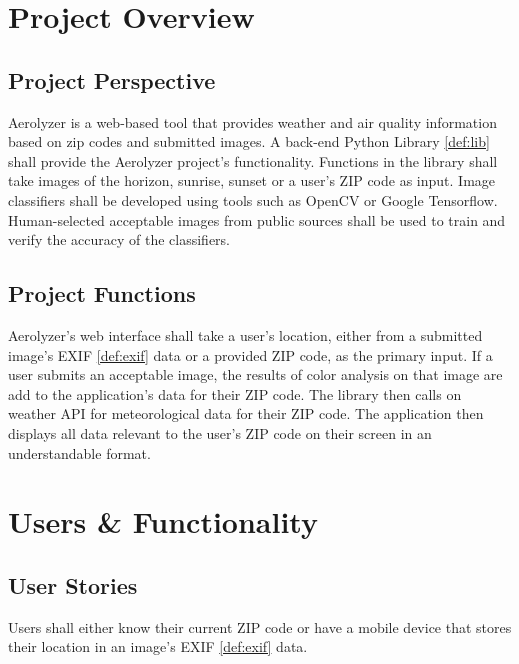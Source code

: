 \documentclass[journal,10pt,draftclsnofoot,onecolumn]{IEEEtran}
\begin{document}
\begin{singlespace}
\clearpage

\section{Project Overview}
	\subsection{Project Perspective}
		Aerolyzer is a web-based tool that provides weather and air quality information based on zip codes and submitted images.
		A back-end Python Library \ref{def:lib} shall provide the Aerolyzer project's functionality.
		Functions in the library shall take images of the horizon, sunrise, sunset or a user's ZIP code as input.
		Image classifiers shall be developed using tools such as OpenCV or Google Tensorflow.
		Human-selected acceptable images from public sources shall be used to train and verify the accuracy of the classifiers.

	\subsection{Project Functions}
		Aerolyzer's web interface shall take a user's location, either from a submitted image's EXIF \ref{def:exif} data or a provided ZIP code, as the primary input.
		If a user submits an acceptable image, the results of color analysis on that image are add to the application's data for their ZIP code.
		The library then calls on weather API for meteorological data for their ZIP code.
		The application then displays all data relevant to the user's ZIP code on their screen in an understandable format.

\clearpage

\section{Users \& Functionality}
	
	\subsection{User Stories}
		Users shall either know their current ZIP code or have a mobile device that stores their location in an image's EXIF \ref{def:exif} data.


\end{singlespace}
\end{document}
